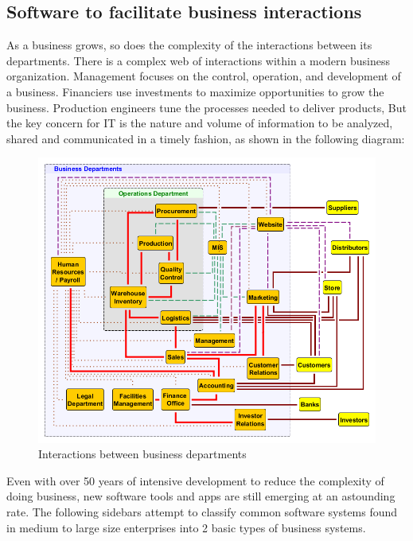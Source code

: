 \documentclass[]{book}
\begin{document}
\hypertarget{software-to-facilitate-business-interactions}{%
\subsection{Software to facilitate business interactions}\label{software-to-facilitate-business-interactions}}

As a business grows, so does the complexity of the interactions between its departments. There is a complex web of interactions within a modern business organization. Management focuses on the control, operation, and development of a business. Financiers use investments to maximize opportunities to grow the business. Production engineers tune the processes needed to deliver products, But the key concern for IT is the nature and volume of information to be analyzed, shared and communicated in a timely fashion,
as shown in the following diagram:

\begin{figure}
\centering
\includegraphics{images/businessdepts.png}
\caption{Interactions between business departments}
\end{figure}

Even with over 50 years of intensive development to reduce the complexity of doing business, new software tools and apps are still emerging at an astounding rate. The following sidebars attempt to classify common software systems found in medium to large size enterprises into 2 basic types of business systems.
\end{document}
